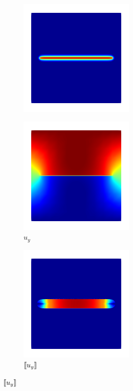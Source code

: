 \begin{frame}
{\begin{figure}
\begin{subfigure}{0.32\textwidth}
                \includegraphics[width=0.6\textwidth]{method/figures/d_0.8.png}
            \end{subfigure}
            \begin{subfigure}{0.32\textwidth}
                \centering
                \caption*{$u_y$}
                \includegraphics[width=0.6\textwidth]{method/figures/uy_0.8.png}
            \end{subfigure}
            \begin{subfigure}{0.32\textwidth}
                \centering
                \caption*{$\left\llbracket u_y\right\rrbracket$}
                \includegraphics[width=0.6\textwidth]{method/figures/w_0.8_wo_cti.png}

\end{subfigure}
\end{figure}}
\end{frame}
